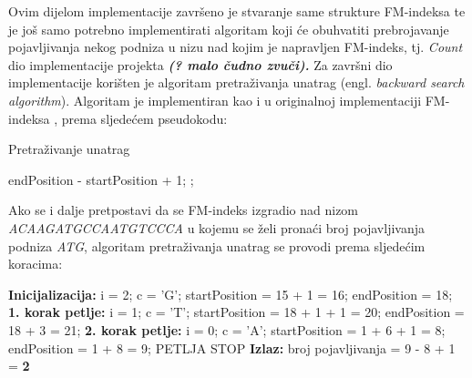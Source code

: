Ovim dijelom implementacije završeno je stvaranje same strukture FM-indeksa te je još samo potrebno implementirati algoritam koji će obuhvatiti prebrojavanje pojavljivanja nekog podniza u nizu nad kojim je napravljen FM-indeks, tj. \emph{Count} dio implementacije projekta \textbf{\emph{(? malo čudno zvuči).}}
Za završni dio implementacije korišten je algoritam pretraživanja unatrag (engl. \emph{backward search algorithm}). Algoritam je implementiran kao i u originalnoj implementaciji FM-indeksa \cite{fm1}, prema sljedećem pseudokodu:


\begin{algorithm}
\caption{ Pretraživanje unatrag }
\label{algo:bws}
\begin{algorithmic}
\ENDFOR
{}
\RETURN endPosition - startPosition + 1;
\ELSE
{};
\ENDIF
\end{algorithmic}
\end{algorithm}


\vspace{20 mm}

Ako se i dalje pretpostavi da se FM-indeks izgradio nad nizom \emph{ACAAGATGCCAATGTCCCA}  u kojemu se želi pronaći broj pojavljivanja podniza \emph{ATG}, algoritam pretraživanja unatrag se provodi prema sljedećim koracima:

\vspace{3 mm}

\textbf{Inicijalizacija:} \newline
i = 2; \newline
c = 'G'; \newline
startPosition = 15 + 1 = 16; \newline
endPosition = 18; \newline
\newline
\textbf{1. korak petlje:} \newline
i = 1; \newline
c = 'T'; \newline
startPosition  = 18 + 1 + 1 = 20; \newline
endPosition = 18 + 3 = 21; \newline
\newline
\textbf{2. korak petlje:} \newline
i = 0; \newline
c = 'A'; \newline
startPosition  = 1 + 6 + 1 = 8; \newline
endPosition = 1 + 8 = 9; \newline
PETLJA STOP \newline
 \newline
\textbf{Izlaz:} broj pojavljivanja = 9 - 8 + 1 = \textbf{2} 




